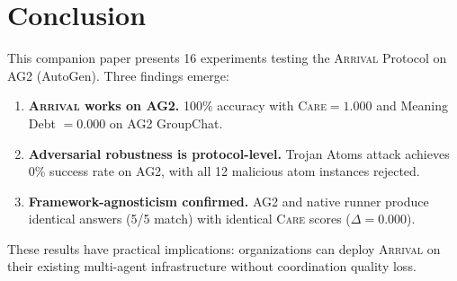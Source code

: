 \documentclass[11pt,a4paper]{article}
\newcommand{\arrival}{\textsc{Arrival}\xspace}
\newcommand{\care}{\textsc{Care}\xspace}
\begin{document}
\section{Conclusion}\label{sec:conclusion}

This companion paper presents 16 experiments testing the \arrival
Protocol on AG2 (AutoGen).  Three findings emerge:

\begin{enumerate}
  \item \textbf{\arrival works on AG2.} 100\% accuracy with
    \care $= 1.000$ and Meaning Debt $= 0.000$ on AG2 GroupChat.
  \item \textbf{Adversarial robustness is protocol-level.} Trojan Atoms
    attack achieves 0\% success rate on AG2, with all 12 malicious atom
    instances rejected.
  \item \textbf{Framework-agnosticism confirmed.} AG2 and native runner
    produce identical answers (5/5 match) with identical \care scores
    ($\Delta = 0.000$).
\end{enumerate}

These results have practical implications: organizations can deploy
\arrival on their existing multi-agent infrastructure without
coordination quality loss.

\end{document}
